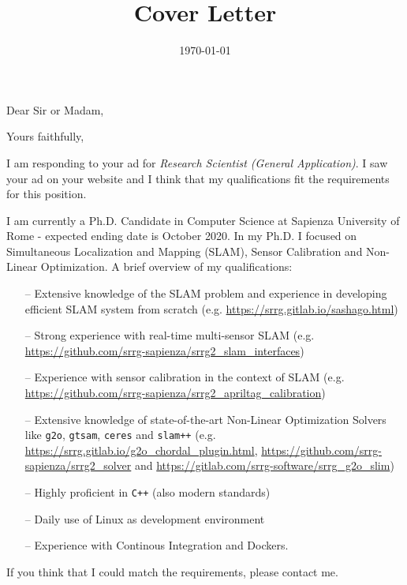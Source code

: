 \documentclass[11pt,a4paper,roman]{moderncv}
\title{Cover Letter}                               %
\begin{document}
\date{\today}
\opening{Dear Sir or Madam,}
\closing{Yours faithfully,}
\makelettertitle

I am responding to your ad for \emph{Research Scientist (General Application)}.
I saw your ad on your website and I think that my qualifications
fit the requirements for this position.

I am currently a Ph.D. Candidate in Computer Science at Sapienza University of Rome -
expected ending date is October 2020.
In my Ph.D. I focused on Simultaneous Localization and Mapping (SLAM), Sensor Calibration and
Non-Linear Optimization. A brief overview of my qualifications:

\vspace{10pt}
\begin{itemize}
\item[--] Extensive knowledge of the SLAM problem and
  experience in developing efficient SLAM system from scratch
  (e.g. \url{https://srrg.gitlab.io/sashago.html})
\item[--] Strong experience with real-time multi-sensor SLAM (e.g. \url{https://github.com/srrg-sapienza/srrg2_slam_interfaces})
\item[--] Experience with sensor calibration in the context of SLAM (e.g. \url{https://github.com/srrg-sapienza/srrg2_apriltag_calibration})
\item[--] Extensive knowledge of state-of-the-art Non-Linear Optimization Solvers like \texttt{g2o}, \texttt{gtsam}, \texttt{ceres} and \texttt{slam++}
  (e.g. \url{https://srrg.gitlab.io/g2o_chordal_plugin.html},
  \url{https://github.com/srrg-sapienza/srrg2_solver} and
  \url{https://gitlab.com/srrg-software/srrg_g2o_slim})
\item[--] Highly proficient in \texttt{C++} (also modern standards)
\item[--] Daily use of Linux as development environment
\item[--] Experience with Continous Integration and Dockers.
\end{itemize}
\vspace{10pt}

If you think that I could match the requirements, please contact me.

\makeletterclosing
\end{document}

